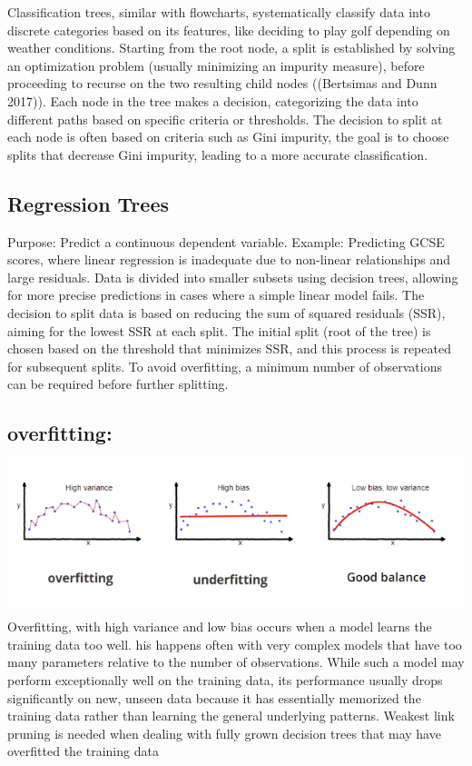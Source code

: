 \documentclass[
  letterpaper,
  DIV=11,
  numbers=noendperiod]{scrreprt}
\begin{document}
Classification trees, similar with flowcharts, systematically classify
data into discrete categories based on its features, like deciding to
play golf depending on weather conditions. Starting from the root node,
a split is established by solving an optimization problem (usually
minimizing an impurity measure), before proceeding to recurse on the two
resulting child nodes ((Bertsimas and Dunn 2017)). Each node in the tree
makes a decision, categorizing the data into different paths based on
specific criteria or thresholds. The decision to split at each node is
often based on criteria such as Gini impurity, the goal is to choose
splits that decrease Gini impurity, leading to a more accurate
classification.

\subsection{Regression Trees}\label{regression-trees}

Purpose: Predict a continuous dependent variable. Example: Predicting
GCSE scores, where linear regression is inadequate due to non-linear
relationships and large residuals. Data is divided into smaller subsets
using decision trees, allowing for more precise predictions in cases
where a simple linear model fails. The decision to split data is based
on reducing the sum of squared residuals (SSR), aiming for the lowest
SSR at each split. The initial split (root of the tree) is chosen based
on the threshold that minimizes SSR, and this process is repeated for
subsequent splits. To avoid overfitting, a minimum number of
observations can be required before further splitting.

\subsection{overfitting:}\label{overfitting}

\includegraphics{overfitting.png}

Overfitting, with high variance and low bias occurs when a model learns
the training data too well. his happens often with very complex models
that have too many parameters relative to the number of observations.
While such a model may perform exceptionally well on the training data,
its performance usually drops significantly on new, unseen data because
it has essentially memorized the training data rather than learning the
general underlying patterns. Weakest link pruning is needed when dealing
with fully grown decision trees that may have overfitted the training
data
\end{document}
